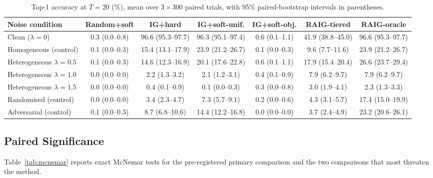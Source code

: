 \documentclass[conference]{IEEEtran}
\begin{document}
\begin{table}[t]
\caption{Top-1 accuracy at $T=20$ (\%), mean over $3 \times 300$ paired trials,
with 95\% paired-bootstrap intervals in parentheses.}
\label{tab:main}
\centering
\footnotesize
\begin{tabular}{@{}lcccccc@{}}
\toprule
\textbf{Noise condition} & \textbf{Random+soft} & \textbf{IG+hard} & \textbf{IG+soft-unif.}
& \textbf{IG+soft-obj.} & \textbf{RAIG-tiered} & \textbf{RAIG-oracle} \\
\midrule
Clean ($\lambda=0$) & 0.3 {\tiny (0.0--0.8)} & 96.6 {\tiny (95.3--97.7)} & 96.3 {\tiny (95.1--97.4)} & 0.6 {\tiny (0.1--1.1)} & 41.9 {\tiny (38.8--45.0)} & 96.6 {\tiny (95.3--97.7)} \\
Homogeneous (control) & 0.1 {\tiny (0.0--0.3)} & 15.4 {\tiny (13.1--17.9)} & 23.9 {\tiny (21.2--26.7)} & 0.1 {\tiny (0.0--0.3)} & 9.6 {\tiny (7.7--11.6)} & 23.9 {\tiny (21.2--26.7)} \\
Heterogeneous $\lambda=0.5$ & 0.1 {\tiny (0.0--0.3)} & 14.6 {\tiny (12.3--16.9)} & 20.1 {\tiny (17.6--22.8)} & 0.6 {\tiny (0.1--1.1)} & 17.9 {\tiny (15.4--20.4)} & 26.6 {\tiny (23.7--29.4)} \\
Heterogeneous $\lambda=1.0$ & 0.0 {\tiny (0.0--0.0)} & 2.2 {\tiny (1.3--3.2)} & 2.1 {\tiny (1.2--3.1)} & 0.4 {\tiny (0.1--0.9)} & 7.9 {\tiny (6.2--9.7)} & 7.9 {\tiny (6.2--9.7)} \\
Heterogeneous $\lambda=1.5$ & 0.0 {\tiny (0.0--0.0)} & 0.4 {\tiny (0.1--0.9)} & 0.1 {\tiny (0.0--0.3)} & 0.3 {\tiny (0.0--0.8)} & 3.0 {\tiny (1.9--4.1)} & 2.3 {\tiny (1.3--3.3)} \\
Randomised (control) & 0.0 {\tiny (0.0--0.0)} & 3.4 {\tiny (2.3--4.7)} & 7.3 {\tiny (5.7--9.1)} & 0.2 {\tiny (0.0--0.6)} & 4.3 {\tiny (3.1--5.7)} & 17.4 {\tiny (15.0--19.9)} \\
Adversarial (control) & 0.1 {\tiny (0.0--0.3)} & 8.7 {\tiny (6.8--10.6)} & 14.4 {\tiny (12.2--16.8)} & 0.0 {\tiny (0.0--0.0)} & 3.7 {\tiny (2.4--4.9)} & 23.2 {\tiny (20.6--26.1)} \\
\bottomrule
\end{tabular}
\end{table}

\subsection{Paired Significance}

Table~\ref{tab:mcnemar} reports exact McNemar tests for the pre-registered
primary comparison and the two comparisons that most threaten the method.
\end{document}
